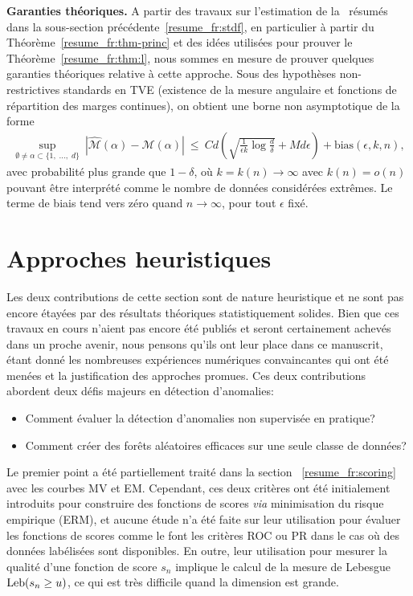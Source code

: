 \textbf{Garanties théoriques.}
A partir des travaux sur l'estimation de la \stdf~résumés dans la sous-section précédente~\ref{resume_fr:stdf}, en particulier à partir du Théorème~\ref{resume_fr:thm-princ} et des idées utilisées pour prouver le Théorème~\ref{resume_fr:thm:l}, nous sommes en mesure de prouver quelques garanties théoriques relative à cette approche.
%
Sous des hypothèses non-restrictives standards en TVE (existence de la mesure angulaire et fonctions de répartition des marges continues), on obtient une borne non asymptotique de la forme
\begin{align*}
\sup_{\emptyset \neq \alpha \subset \{1,\; \ldots,\; d \}}~ |\widehat{\mathcal{M}}(\alpha)- \mathcal{M}(\alpha)|
~\le~  C d \left( \sqrt{ \frac{1}{\epsilon k}\log\frac{d}{\delta}} + M d\epsilon \right) + \text{bias}(\epsilon, k, n),
\end{align*}
avec probabilité plus grande que $1-\delta$, où $k = k(n) \to \infty$ avec $k(n) = o(n)$ pouvant être interprété comme le nombre de données considérées extrêmes.
Le terme de biais tend vers zéro quand $n \to \infty$, pour tout $\epsilon$ fixé.


\section{Approches heuristiques}
\label{resume_fr:sec:heuristic}

Les deux contributions de cette section sont de nature heuristique et ne sont pas encore étayées par des résultats théoriques statistiquement solides. Bien que ces travaux en cours n'aient pas encore été publiés et seront certainement achevés dans un proche avenir, nous pensons qu'ils ont leur place dans ce manuscrit, étant donné les nombreuses expériences numériques convaincantes qui ont été menées et la justification des approches promues.
%
Ces deux contributions abordent deux défis majeurs en détection d'anomalies:

\begin{itemize}
\item Comment évaluer la détection d'anomalies non supervisée en pratique?
\item Comment créer des forêts aléatoires efficaces sur une seule classe de données?
\end{itemize}

Le premier point a été partiellement traité dans la section ~\ref{resume_fr:scoring} avec les courbes MV et EM.
Cependant, ces deux critères ont été initialement introduits pour construire des fonctions de scores \emph{via} minimisation du risque empirique (ERM), et aucune étude n'a été faite sur leur utilisation pour évaluer les fonctions de scores comme le font les critères ROC ou PR dans le cas où des données labélisées sont disponibles.
En outre, leur utilisation pour mesurer la qualité d'une fonction de score $s_n$ implique le calcul de la mesure de Lebesgue $\text{Leb}(s_n\ge u) $, ce qui est très difficile quand la dimension est grande.

